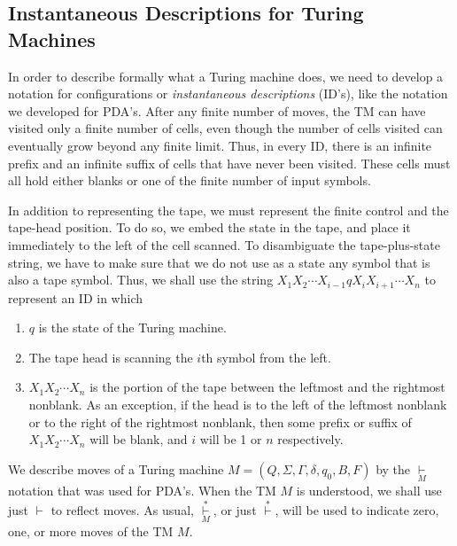 \documentclass[]{article}
\begin{document}
\subsection*{Instantaneous Descriptions for Turing Machines}
In order to describe formally what a Turing machine does, we need to
develop a notation for configurations or \emph{instantaneous descriptions}
(ID's), like the notation we developed for PDA's. After any finite number
of moves, the TM can have visited only a finite number of cells, even
though the number of cells visited can eventually grow beyond any finite
limit. Thus, in every ID, there is an infinite prefix and an infinite
suffix of cells that have never been visited. These cells must all hold
either blanks or one of the finite number of input symbols.

In addition to representing the tape, we must represent the finite control
and the tape-head position. To do so, we embed the state in the tape, and
place it immediately to the left of the cell scanned. To disambiguate the
tape-plus-state string, we have to make sure that we do not use as a state
any symbol that is also a tape symbol. Thus, we shall use the string
$X_1X_2\cdots{}X_{i-1}qX_iX_{i+1}\cdots{}X_n$ to represent an ID in which
\begin{enumerate}
\item $q$ is the state of the Turing machine.
\item The tape head is scanning the $i$th symbol from the left.
\item $X_1X_2\cdots{}X_n$ is the portion of the tape between the
leftmost and the rightmost nonblank. As an exception, if the head is to
the left of the leftmost nonblank or to the right of the rightmost
nonblank, then some prefix or suffix of $X_1X_2\cdots{}X_n$ will be
blank, and $i$ will be 1 or $n$ respectively.
\end{enumerate}

We describe moves of a Turing machine
$M = (Q,\Sigma,\Gamma,\delta,q_0,B,F)$ by the $\underset{M}{\vdash}$
notation that was used for PDA's. When the TM $M$ is understood, we shall
use just $\vdash$ to reflect moves. As usual,
$\overset{*}{\underset{M}{\vdash}}$, or just $\overset{*}{\vdash}$, will be
used to indicate zero, one, or more moves of the TM $M$.
\end{document}
